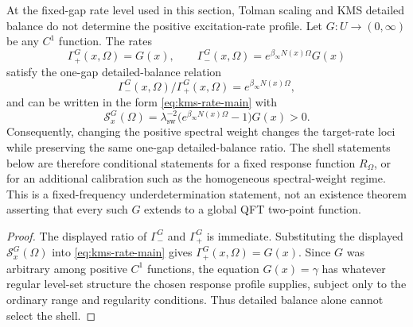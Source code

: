 \begin{lemma}\label{lem:one-gap-kms-underdetermination-main}
At the fixed-gap rate level used in this section, Tolman scaling and KMS detailed balance do not determine the positive excitation-rate profile. Let $G:U\to(0,\infty)$ be any $C^1$ function. The rates
\[
\Gamma_+^G(x,\Omega)=G(x),
\qquad
\Gamma_-^G(x,\Omega)=e^{\beta_\infty N(x)\Omega}G(x)
\]
satisfy the one-gap detailed-balance relation
\[
\Gamma_-^G(x,\Omega)/\Gamma_+^G(x,\Omega)
=e^{\beta_\infty N(x)\Omega},
\]
and can be written in the form \eqref{eq:kms-rate-main} with
\[
\mathcal S_x^G(\Omega)=
\lambda_{\mathrm{sw}}^{-2}\bigl(e^{\beta_\infty N(x)\Omega}-1\bigr)G(x)>0 .
\]
Consequently, changing the positive spectral weight changes the target-rate loci while preserving the same one-gap detailed-balance ratio. The shell statements below are therefore conditional statements for a fixed response function $R_\Omega$, or for an additional calibration such as the homogeneous spectral-weight regime. This is a fixed-frequency underdetermination statement, not an existence theorem asserting that every such $G$ extends to a global QFT two-point function.
\end{lemma}

\begin{proof}
The displayed ratio of $\Gamma_-^G$ and $\Gamma_+^G$ is immediate. Substituting the displayed $\mathcal S_x^G(\Omega)$ into \eqref{eq:kms-rate-main} gives $\Gamma_+^G(x,\Omega)=G(x)$. Since $G$ was arbitrary among positive $C^1$ functions, the equation $G(x)=\gamma$ has whatever regular level-set structure the chosen response profile supplies, subject only to the ordinary range and regularity conditions. Thus detailed balance alone cannot select the shell.
\end{proof}

